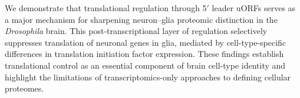 \documentclass[11pt]{article}
\begin{document}
We demonstrate that translational regulation through 5$'$ leader uORFs serves as a major mechanism for sharpening neuron--glia proteomic distinction in the \textit{Drosophila} brain. This post-transcriptional layer of regulation selectively suppresses translation of neuronal genes in glia, mediated by cell-type-specific differences in translation initiation factor expression. These findings establish translational control as an essential component of brain cell-type identity and highlight the limitations of transcriptomics-only approaches to defining cellular proteomes.



\end{document}
